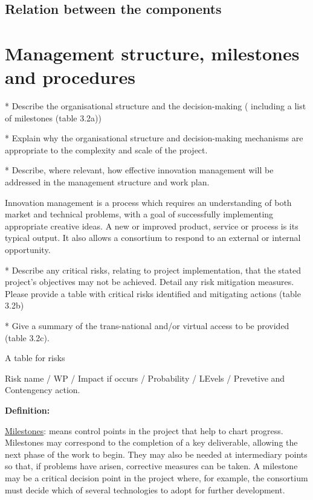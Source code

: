\newpage



\subsection{Relation between the components}


\section{Management structure, milestones and procedures}

\begin{todo}{}\color{red}
  * Describe the organisational structure and the decision-making ( including a list of milestones (table 3.2a))

  * Explain why the organisational structure and decision-making mechanisms are appropriate to the complexity and scale of the project.

  * Describe, where relevant, how effective innovation management will be addressed in the management structure and work plan.

  Innovation management is a process which requires an understanding of both market and technical problems, with a goal of successfully implementing appropriate creative ideas. A new or improved product, service or process is its typical output. It also allows a consortium to respond to an external or internal opportunity.

  * Describe any critical risks, relating to project implementation, that the stated project's objectives may not be achieved. Detail any risk mitigation measures. Please provide a table with critical risks identified and mitigating actions (table 3.2b)

  * Give a summary of the trans-national and/or virtual access to be provided (table 3.2c).


  {\color{red} A table for risks}

    Risk name / WP / Impact if occurs / Probability / LEvels / Prevetive and
    Contengency action.

  {\bf Definition:}
  
  \underline{Milestones}: means control points in the project that help to chart progress. Milestones may correspond to the completion of a key deliverable, allowing the next phase of the work to begin. They may also be needed at intermediary points so that, if problems have arisen, corrective measures can be taken. A milestone may be a critical decision point in the project where, for example, the consortium must decide which of several technologies to adopt for further development.
\end{todo}


